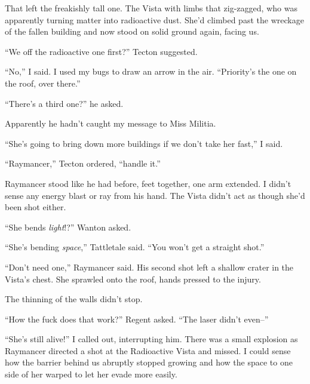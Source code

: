 That left the freakishly tall one.  The Vista with limbs that zig-zagged, who was apparently turning matter into radioactive dust.  She'd climbed past the wreckage of the fallen building and now stood on solid ground again, facing us.



``We off the radioactive one first?'' Tecton suggested.



``No,'' I said.  I used my bugs to draw an arrow in the air.  ``Priority's the one on the roof, over there.''



``There's a third one?'' he asked.



Apparently he hadn't caught my message to Miss Militia.



``She's going to bring down more buildings if we don't take her fast,'' I said.



``Raymancer,'' Tecton ordered, ``handle it.''



Raymancer stood like he had before, feet together, one arm extended.  I didn't sense any energy blast or ray from his hand.  The Vista didn't act as though she'd been shot either.



``She bends \emph{light}!?''  Wanton asked.



``She's bending \emph{space},'' Tattletale said.  ``You won't get a straight shot.''



``Don't need one,'' Raymancer said.  His second shot left a shallow crater in the Vista's chest.  She sprawled onto the roof, hands pressed to the injury.



The thinning of the walls didn't stop.



``How the fuck does that work?'' Regent asked.  ``The laser didn't even--''



``She's still alive!'' I called out, interrupting him.  There was a small explosion as  Raymancer directed a shot at the Radioactive Vista and missed.  I could sense how the barrier behind us abruptly stopped growing and how the space to one side of her warped to let her evade more easily.



